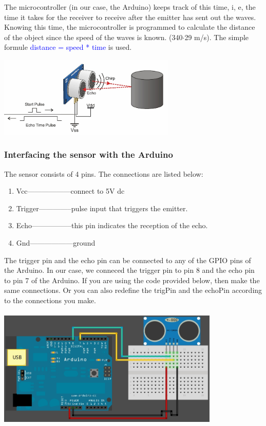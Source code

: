 \documentclass[a4paper,12pt]{article}
\begin{document}
The microcontroller (in our case, the Arduino) keeps track of this time, i, e, the time it takes for the receiver to receive after the 
emitter has sent out the waves. Knowing this time, the microcontroller is programmed to calculate the distance of the object since the 
speed of the waves is known. (340$\cdot$29 m/s). The simple formule \textcolor{blue}{distance = speed * time} is used.

\includegraphics[width=240pt]{working}

\subsubsection*{Interfacing the sensor with the Arduino}
The sensor consists of 4 pins. The connections are listed below:

\begin{enumerate}
 \item Vcc------------------connect to 5V dc
 \item Trigger--------------pulse input that triggers the emitter. 
 \item Echo-----------------this pin indicates the reception of the echo.
 \item Gnd------------------ground
\end{enumerate}


The trigger pin and the echo pin can be connected to any of the GPIO pins of the Arduino. In our case, we conneced the trigger pin
to pin 8 and the echo pin to pin 7 of the Arduino. If you are using the code provided below, then make the same connections. Or you can
also redefine the trigPin and the echoPin according to the connections you make.
\\
\\
\includegraphics[width=300pt]{ardsketch}
\vspace{1cm}
\end{document}
